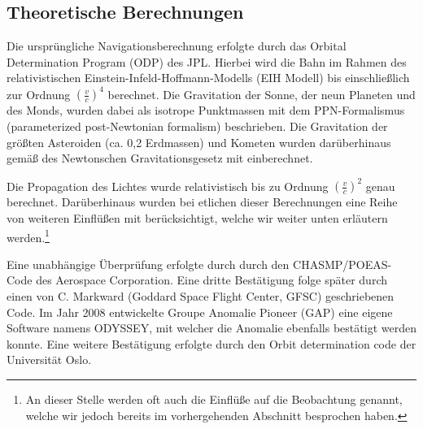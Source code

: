 \documentclass[a4paper,10pt]{article}
\begin{document}
\subsection{Theoretische Berechnungen}
Die ursprüngliche Navigationsberechnung erfolgte durch das Orbital Determination Program (ODP) des JPL.
Hierbei wird die Bahn im Rahmen des relativistischen Einstein-Infeld-Hoffmann-Modells (EIH Modell)
bis einschließlich zur Ordnung $(\frac{v}{c})^4$ berechnet.
Die Gravitation der Sonne, der neun Planeten und des Monds, wurden dabei als isotrope Punktmassen mit dem
PPN-Formalismus (parameterized post-Newtonian formalism) beschrieben\cite{Anderson2002}. Die Gravitation der größten
Asteroiden (ca. 0,2 Erdmassen) und Kometen wurden darüberhinaus gemäß des Newtonschen Gravitationsgesetz mit einberechnet.

Die Propagation des Lichtes wurde relativistisch bis zu Ordnung $(\frac{v}{c})^2$ genau berechnet.
Darüberhinaus wurden bei etlichen dieser Berechnungen eine Reihe von weiteren Einflüßen mit berücksichtigt, welche wir weiter unten %
erläutern werden.\footnote{An dieser Stelle werden oft auch die Einflüße auf die Beobachtung genannt, welche wir jedoch bereits im vorhergehenden Abschnitt besprochen haben.}

Eine unabhängige Überprüfung erfolgte durch durch den CHASMP/POEAS-Code des Aerospace Corporation.
Eine dritte Bestätigung folge später durch einen von C. Markward (Goddard Space Flight Center, GFSC) geschriebenen Code.
Im Jahr 2008 entwickelte Groupe Anomalie Pioneer (GAP) eine eigene Software namens ODYSSEY,
mit welcher die Anomalie ebenfalls bestätigt werden konnte.
Eine weitere Bestätigung erfolgte durch den Orbit determination code der Universität Oslo.
\end{document}
